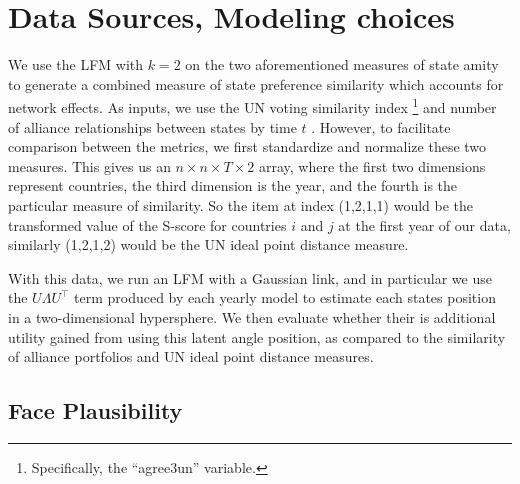 \section*{Data Sources, Modeling choices}

We use the LFM with $k=2$ on the two aforementioned measures of state amity to generate a combined measure of state preference similarity which accounts for network effects. As inputs, we use the UN voting similarity index \citep{voeten:2013}\footnote{Specifically, the ``agree3un'' variable.} and number of alliance relationships between states by time $t$ \citep{gibler:sarkees:2004}. However, to facilitate comparison between the metrics, we first standardize and normalize these two measures. This gives us an $n \times n \times T \times 2$ array, where the first two dimensions represent countries, the third dimension is the year, and the fourth is the particular measure of similarity. So the item at index (1,2,1,1) would be the transformed value of the S-score for countries $i$ and $j$ at the first year of our data, similarly (1,2,1,2) would be the UN ideal point distance measure.


With this data, we run an LFM with a Gaussian link, and in particular we use the $U \Lambda U^{\top}$ term produced by each yearly model to estimate each states position in a two-dimensional hypersphere. We then evaluate whether their is additional utility gained from using this latent angle position, as compared to the similarity of alliance portfolios and UN ideal point distance measures.

\subsection*{Face Plausibility}

